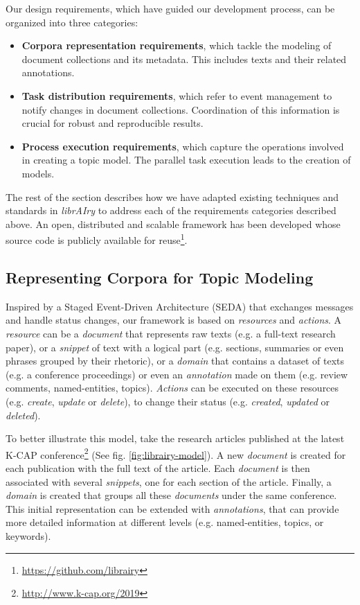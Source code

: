 Our design requirements, which have guided our development process, can be organized into three categories:
\begin{itemize}
\item \textbf{Corpora representation requirements}, which tackle the modeling of document collections and its metadata. This includes texts and their related annotations.
\item \textbf{Task distribution requirements}, which refer to event management to notify changes in document collections. Coordination of this information is crucial for robust and reproducible results.  
\item \textbf{Process execution requirements}, which capture the operations involved in creating a topic model. The parallel task execution leads to the creation of models.
\end{itemize}

The rest of the section describes how we have adapted existing techniques and standards in \textit{librAIry} to address each of the requirements categories described above. An open, distributed and scalable framework has been developed whose source code is publicly available for reuse\footnote{\url{https://github.com/librairy}}.

\subsection{Representing Corpora for Topic Modeling}

Inspired by a Staged Event-Driven Architecture (SEDA) that exchanges messages and handle status changes, our framework is based on \textit{resources} and \textit{actions}. A \textit{resource} can be a \textit{document} that represents raw texts (e.g. a full-text research paper), or a \textit{snippet} of text with a logical part  (e.g. sections, summaries or even phrases grouped by their rhetoric), or a \textit{domain} that contains a dataset of texts (e.g. a conference proceedings) or even an \textit{annotation} made on them (e.g. review comments, named-entities, topics). \textit{Actions} can be executed on these resources (e.g. \textit{create}, \textit{update} or \textit{delete}), to change their status (e.g. \textit{created}, \textit{updated} or \textit{deleted}).

To better illustrate this model, take the research articles published at the latest K-CAP conference\footnote{\url{http://www.k-cap.org/2019}} (See fig. \ref{fig:librairy-model}). A new \textit{document} is created for each publication with the full text of the article. Each \textit{document} is then associated with several \textit{snippets}, one for each section of the article. Finally, a \textit{domain} is created that groups all these \textit{documents} under the same conference. This initial representation can be extended with \textit{annotations}, that can provide more detailed information at different levels (e.g. named-entities, topics, or keywords).

